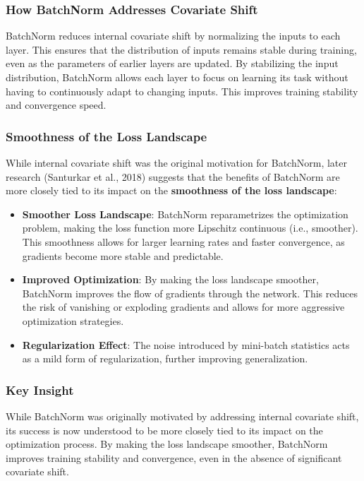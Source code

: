 \begin{notechapter}
\subsubsection{How BatchNorm Addresses Covariate Shift}
BatchNorm reduces internal covariate shift by normalizing the inputs
to each layer. This ensures that the distribution of inputs remains
stable during training, even as the parameters of earlier layers are
updated. By stabilizing the input distribution, BatchNorm allows each
layer to focus on learning its task without having to continuously
adapt to changing inputs. This improves training stability and
convergence speed.

\subsubsection{Smoothness of the Loss Landscape}
While internal covariate shift was the original motivation for BatchNorm,
later research (Santurkar et al., 2018) suggests that the benefits of
BatchNorm are more closely tied to its impact on the \textbf{smoothness of the
loss landscape}:

\begin{itemize}
    \item \textbf{Smoother Loss Landscape}:
    BatchNorm reparametrizes the optimization problem, making the loss
    function more Lipschitz continuous (i.e., smoother). This smoothness
    allows for larger learning rates and faster convergence, as gradients
    become more stable and predictable.

    \item \textbf{Improved Optimization}:
    By making the loss landscape smoother, BatchNorm improves the flow
    of gradients through the network. This reduces the risk of vanishing
    or exploding gradients and allows for more aggressive optimization
    strategies.

    \item \textbf{Regularization Effect}:
    The noise introduced by mini-batch statistics acts as a mild form
    of regularization, further improving generalization.
\end{itemize}

\subsubsection{Key Insight}
While BatchNorm was originally motivated by addressing internal covariate
shift, its success is now understood to be more closely tied to its impact
on the optimization process. By making the loss landscape smoother,
BatchNorm improves training stability and convergence, even in the absence
of significant covariate shift.


\end{notechapter}
